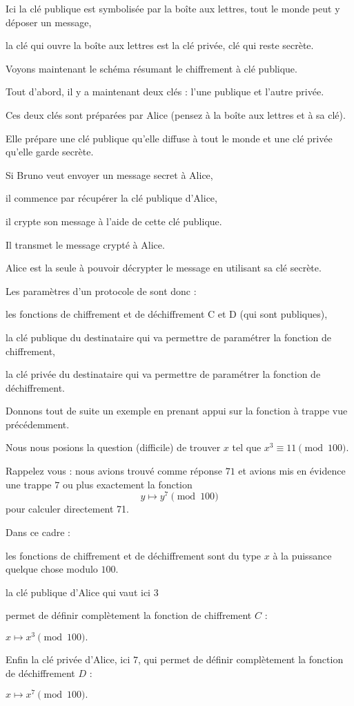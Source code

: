 Ici la clé publique est symbolisée par la boîte aux lettres, tout le monde peut y déposer
un message, 

la clé qui ouvre la boîte aux lettres est la clé privée, clé qui reste secrète.


\diapo

Voyons maintenant le schéma résumant le chiffrement à clé publique.

Tout d'abord, il y a maintenant deux clés : l'une publique et l'autre privée.

Ces deux clés sont préparées par Alice (pensez à la boîte aux lettres et à sa clé).

Elle prépare une clé publique qu'elle diffuse à tout le monde
et une clé privée qu'elle garde secrète.

Si Bruno veut envoyer un message secret à Alice,

il commence par récupérer la clé publique d'Alice,

il crypte son message à l'aide de cette clé publique.

Il transmet le message crypté à Alice.

Alice est la seule à pouvoir décrypter le message en utilisant sa clé secrète.


\diapo

Les paramètres d'un protocole de  sont donc : 

\change
les fonctions de chiffrement et de déchiffrement C et D (qui sont publiques),

\change
la clé publique du destinataire qui va permettre de paramétrer la fonction de chiffrement,

\change
la clé privée du destinataire qui va permettre de paramétrer la fonction de déchiffrement.


\change
Donnons tout de suite un exemple en prenant appui sur la fonction à trappe vue précédemment.

Nous nous posions la question (difficile) de trouver $x$ tel que $x^3 \equiv 11 \pmod{100}$.

Rappelez vous : nous avions trouvé comme réponse $71$ et avions mis en évidence une trappe $7$ ou plus exactement la fonction 
$$y\longmapsto y^{7} \pmod{100}$$
pour calculer directement 71.

\change
Dans ce cadre :

les fonctions de chiffrement et de déchiffrement sont du type $x$ à la puissance quelque chose modulo $100$.

\change
la clé publique d'Alice qui vaut ici $3$

permet de définir complètement la fonction de chiffrement $C$ : 

$x\longmapsto x^3 \pmod{100}.$

\change
Enfin  la clé privée d'Alice, ici $7$,
qui permet de définir complètement la fonction de déchiffrement $D$ : 

$x\longmapsto x^7 \pmod{100}.$




